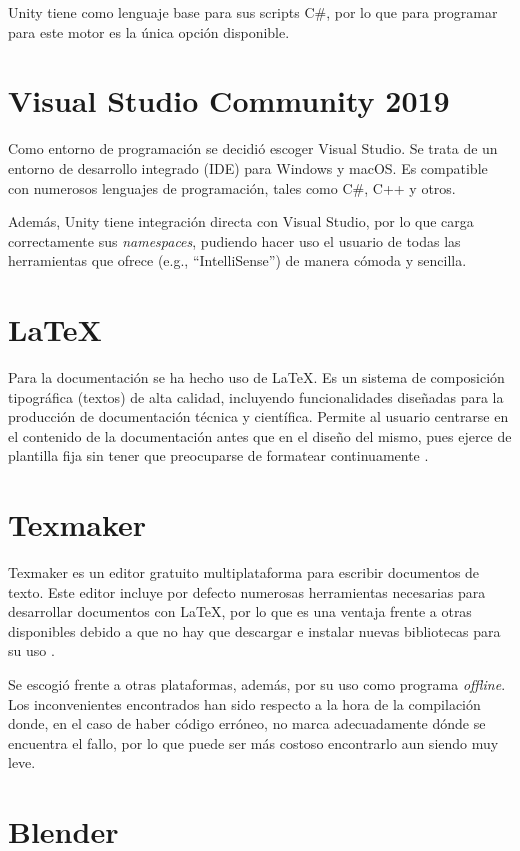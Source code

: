 Unity tiene como lenguaje base para sus scripts C\#, por lo que para programar para este motor es la única opción disponible.

\section{Visual Studio Community 2019}

Como entorno de programación se decidió escoger Visual Studio. Se trata de un entorno de desarrollo integrado (IDE) para Windows y macOS. Es compatible con numerosos lenguajes de programación, tales como C\#, C++ y otros. 

Además, Unity tiene integración directa con Visual Studio, por lo que carga correctamente sus \textit{namespaces}, pudiendo hacer uso el usuario de todas las herramientas que ofrece (e.g., ``IntelliSense'') de manera cómoda y sencilla.

\section{LaTeX}

Para la documentación se ha hecho uso de LaTeX. Es un sistema de composición tipográfica (textos) de alta calidad, incluyendo funcionalidades diseñadas para la producción de documentación técnica y científica. Permite al usuario centrarse en el contenido de la documentación antes que en el diseño del mismo, pues ejerce de plantilla fija sin tener que preocuparse de formatear continuamente \cite{latex}.

\section{Texmaker}

Texmaker es un editor gratuito multiplataforma para escribir documentos de texto. Este editor incluye por defecto numerosas herramientas necesarias para desarrollar documentos con LaTeX, por lo que es una ventaja frente a otras disponibles debido a que no hay que descargar e instalar nuevas bibliotecas para su uso \cite{texmaker}.

Se escogió frente a otras plataformas, además, por su uso como programa \textit{offline}. Los inconvenientes encontrados han sido respecto a la hora de la compilación donde, en el caso de haber código erróneo, no marca adecuadamente dónde se encuentra el fallo, por lo que puede ser más costoso encontrarlo aun siendo muy leve.

\section{Blender}

